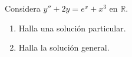 Considera \(y''+2y=e^x+x^3\) en \(\mathbb R\).

\begin{enumerate}[label=(\alph*),ref=\alph*,leftmargin=*]
\item Halla una solución particular.
\item Halla la solución general.
\end{enumerate}
